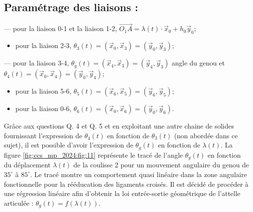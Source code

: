 \subsection*{Paramétrage des liaisons :}
— pour la liaison 0-1 et la liaison 1-2, $\overrightarrow{O_{1} A}=\lambda(t) \cdot \vec{x}_{0}+h_{0} \vec{y}_{0}$;

\begin{itemize}
  \item pour la liaison 2-3, $\theta_{3}(t)=\left(\vec{x}_{0}, \vec{x}_{3}\right)=\left(\vec{y}_{0}, \vec{y}_{3}\right)$;
\end{itemize}

— pour la liaison 3-4, $\theta_{g}(t)=\left(\vec{x}_{4}, \vec{x}_{3}\right)=\left(\vec{y}_{4}, \vec{y}_{3}\right)$ angle du genou et $\theta_{4}(t)=\left(\vec{x}_{0}, \vec{x}_{4}\right)=\left(\vec{y}_{0}, \vec{y}_{4}\right)$;

\begin{itemize}
  \item pour la liaison 5-6, $\theta_{5}(t)=\left(\vec{x}_{6}, \vec{x}_{5}\right)=\left(\vec{y}_{6}, \vec{y}_{5}\right)$;

  \item pour la liaison 0-6, $\theta_{6}(t)=\left(\vec{x}_{0}, \vec{x}_{6}\right)=\left(\vec{y}_{0}, \vec{y}_{6}\right)$.

\end{itemize}



Grâce aux questions Q. 4 et Q. 5 et en exploitant une autre chaine de solides fournissant l'expression de $\theta_{4}(t)$ en fonction de $\theta_{3}(t)$ (non abordée dans ce sujet), il est possible d'avoir l'expression de $\theta_{g}(t)$ en fonction de $\lambda(t)$. La figure \ref{fig:ccs_mp_2024:fig:11} représente le tracé de l'angle $\theta_{g}(t)$ en fonction du déplacement $\lambda(t)$ de la coulisse 2 pour un mouvement angulaire du genou de $35^{\circ}$ à $85^{\circ}$. Le tracé montre un comportement quasi linéaire dans la zone angulaire fonctionnelle pour la rééducation des ligaments croisés. Il est décidé de procéder à une régression linéaire afin d'obtenir la loi entrée-sortie géométrique de l'attelle articulée : $\theta_{g}(t)=f(\lambda(t))$.

